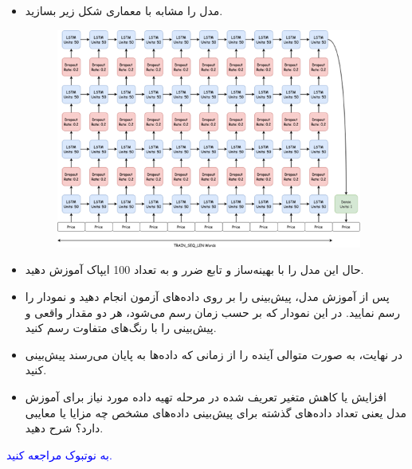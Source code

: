 \documentclass[12pt]{article}
\begin{document}
\begin{enumerate}
\begin{itemize}
        \item   مدل را مشابه با معماری شکل زیر بسازید.
        \begin{figure}[h]  
            \centering
            \includegraphics[width=0.95\textwidth]{figs/Q6_2.png}
            \label{fig:num_pic}  
        \end{figure}
        \item   حال این مدل را با بهینه‌ساز  و تابع ضرر  و  به تعداد 100 ایپاک آموزش دهید.
        \item   پس از آموزش مدل، پیش‌بینی را بر روی داده‌های آزمون انجام دهید و نمودار را رسم نمایید. در این نمودار که بر حسب زمان رسم می‌شود، هر دو مقدار واقعی و پیش‌بینی را با رنگ‌های متفاوت رسم کنید.
        \item   در نهایت، به صورت متوالی آینده را از زمانی که داده‌ها به پایان می‌رسند پیش‌بینی کنید.
        \item   افزایش یا کاهش متغیر تعریف شده در مرحله تهیه داده مورد نیاز برای آموزش مدل یعنی تعداد داده‌های گذشته برای پیش‌بینی داده‌های مشخص چه مزایا یا معایبی دارد؟ شرح دهید.
        
    \end{itemize}
    \textcolor{blue}{
    به نوتبوک  مراجعه کنید.
    }

\end{enumerate}
\end{document}
